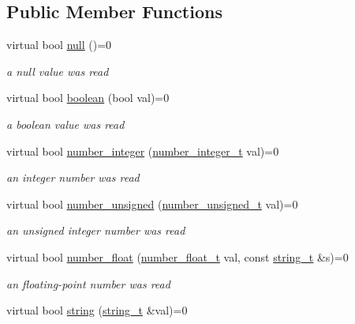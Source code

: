 \subsection*{Public Member Functions}
\begin{DoxyCompactItemize}
\item 
virtual bool \hyperlink{structnlohmann_1_1json__sax_a0ad26edef3f8d530dcec3192bba82df6}{null} ()=0
\begin{DoxyCompactList}\small\item\em a null value was read \end{DoxyCompactList}\item 
virtual bool \hyperlink{structnlohmann_1_1json__sax_a82ed080814fa656191a537284bb0c575}{boolean} (bool val)=0
\begin{DoxyCompactList}\small\item\em a boolean value was read \end{DoxyCompactList}\item 
virtual bool \hyperlink{structnlohmann_1_1json__sax_affa7a78b8e9cc9cc3ac99927143142a5}{number\+\_\+integer} (\hyperlink{structnlohmann_1_1json__sax_a0cef30121f02b7fee85e9708148ea0aa}{number\+\_\+integer\+\_\+t} val)=0
\begin{DoxyCompactList}\small\item\em an integer number was read \end{DoxyCompactList}\item 
virtual bool \hyperlink{structnlohmann_1_1json__sax_ad9b253083e0509923ba195136f49face}{number\+\_\+unsigned} (\hyperlink{structnlohmann_1_1json__sax_a32028cc056ae0f43aaae331cdbbbf856}{number\+\_\+unsigned\+\_\+t} val)=0
\begin{DoxyCompactList}\small\item\em an unsigned integer number was read \end{DoxyCompactList}\item 
virtual bool \hyperlink{structnlohmann_1_1json__sax_ae7c31614e8a82164d2d7f8dbf4671b25}{number\+\_\+float} (\hyperlink{structnlohmann_1_1json__sax_a390c209bffd8c4800c8f3076dc465a20}{number\+\_\+float\+\_\+t} val, const \hyperlink{structnlohmann_1_1json__sax_ae01977a9f3c5b3667b7a2929ed91061e}{string\+\_\+t} \&s)=0
\begin{DoxyCompactList}\small\item\em an floating-\/point number was read \end{DoxyCompactList}\item 
virtual bool \hyperlink{structnlohmann_1_1json__sax_a07eab82f6c82d606787eee9ad73d2bda}{string} (\hyperlink{structnlohmann_1_1json__sax_ae01977a9f3c5b3667b7a2929ed91061e}{string\+\_\+t} \&val)=0

\end{DoxyCompactItemize}

